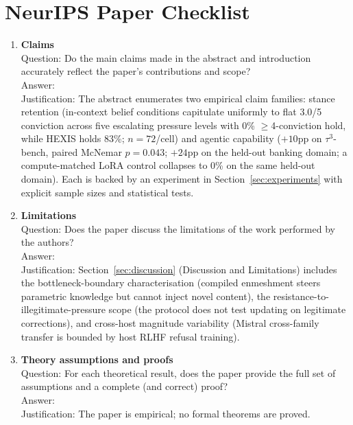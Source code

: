 
\section*{NeurIPS Paper Checklist}

\begin{enumerate}

\item {\bf Claims}\\
    Question: Do the main claims made in the abstract and introduction
    accurately reflect the paper's contributions and scope?\\
    Answer: \answerYes{}\\
    Justification: The abstract enumerates two empirical claim families:
    stance retention (in-context belief conditions capitulate uniformly to
    flat 3.0/5 conviction across five escalating pressure levels with 0\%
    $\geq$4-conviction hold, while HEXIS holds 83\%; $n=72$/cell)
    and agentic capability ($+10$pp on $\tau^3$-bench, paired McNemar
    $p{=}0.043$; $+24$pp on the held-out banking domain; a compute-matched
    LoRA control collapses to 0\% on the same held-out domain). Each is
    backed by an experiment in Section~\ref{sec:experiments} with explicit
    sample sizes and statistical tests.

\item {\bf Limitations}\\
    Question: Does the paper discuss the limitations of the work performed by
    the authors?\\
    Answer: \answerYes{}\\
    Justification: Section~\ref{sec:discussion} (Discussion and Limitations)
    includes the bottleneck-boundary characterisation (compiled enmeshment
    steers parametric knowledge but cannot inject novel content), the
    resistance-to-illegitimate-pressure scope (the protocol does not test
    updating on legitimate corrections), and cross-host magnitude variability
    (Mistral cross-family transfer is bounded by host RLHF refusal training).

\item {\bf Theory assumptions and proofs}\\
    Question: For each theoretical result, does the paper provide the full set
    of assumptions and a complete (and correct) proof?\\
    Answer: \answerNA{}\\
    Justification: The paper is empirical; no formal theorems are proved.


\end{enumerate}
